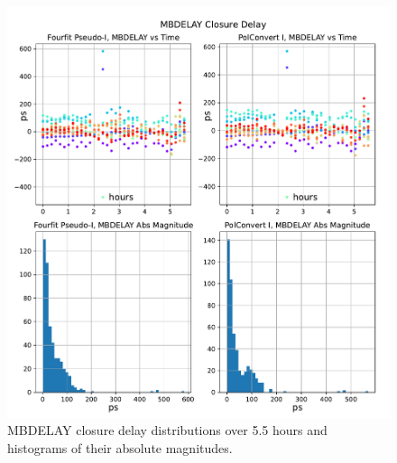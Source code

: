 \documentclass[letterpaper,twoside,12pt]{article}
\begin{document}
\begin{figure}[h!]
  \centering
  \includegraphics[width=35pc]{MBDELAY_Closure_Delay.pdf}
  \caption{\small MBDELAY closure delay distributions over 5.5 hours and histograms of their absolute magnitudes.}
  \label{mbd}
\end{figure}
\end{document}
